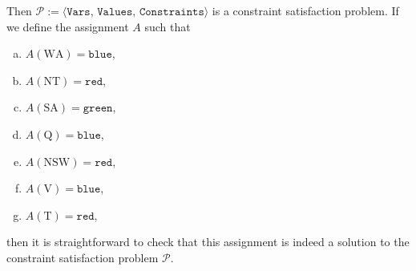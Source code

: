 Then $\mathcal{P} := \langle \texttt{Vars},\, \texttt{Values},\, \texttt{Constraints} \rangle$ is a constraint satisfaction problem.  
If we define the assignment $A$ such that
\begin{enumerate}[(a)]
\item $A(\mathrm{WA}) = \texttt{blue}$,
\item $A(\mathrm{NT}) = \texttt{red}$,
\item $A(\mathrm{SA}) = \texttt{green}$,
\item $A(\mathrm{Q}) = \texttt{blue}$,
\item $A(\mathrm{NSW}) = \texttt{red}$,
\item $A(\mathrm{V}) = \texttt{blue}$,
\item $A(\mathrm{T}) = \texttt{red}$,
\end{enumerate}
then it is straightforward to check that this assignment is indeed a solution to the constraint satisfaction problem $\mathcal{P}$.

